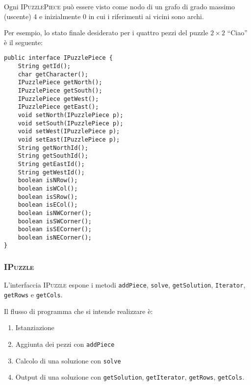 \documentclass[a4paper]{article}
\newcommand{\Classname}[1]{\textsc{#1}}
\newcommand{\Ifacename}[1]{\textsc{#1}}
\newcommand{\Methodname}[1]{\texttt{#1}}
\begin{document}
Ogni \Ifacename{IPuzzlePiece} pu\`o essere visto come nodo di un grafo di grado massimo (uscente) 4 e inizialmente 0 in cui i riferimenti ai vicini sono archi.

Per esempio, lo stato finale desiderato per i quattro pezzi del puzzle $2\times2$ ``Ciao'' \`e il seguente:


\begin{lstlisting}[frame=single]
public interface IPuzzlePiece {
	String getId();
	char getCharacter();
	IPuzzlePiece getNorth();
	IPuzzlePiece getSouth();
	IPuzzlePiece getWest();
	IPuzzlePiece getEast();
	void setNorth(IPuzzlePiece p);
	void setSouth(IPuzzlePiece p);
	void setWest(IPuzzlePiece p);
	void setEast(IPuzzlePiece p);
	String getNorthId();
	String getSouthId();
	String getEastId();
	String getWestId();
	boolean isNRow();
	boolean isWCol();
	boolean isSRow();
	boolean isECol();
	boolean isNWCorner();
	boolean isSWCorner();
	boolean isSECorner();
	boolean isNECorner();
}
\end{lstlisting}

\subsubsection{\Classname{IPuzzle}}
L'interfaccia \Ifacename{IPuzzle} espone i metodi \Methodname{addPiece}, \Methodname{solve}, \Methodname{getSolution}, \Methodname{Iterator}, \Methodname{getRows} e \Methodname{getCols}.

Il flusso di programma che si intende realizzare \`e:

\begin{enumerate}
\item Istanziazione
\item Aggiunta dei pezzi con \Methodname{addPiece}
\item Calcolo di una soluzione con \Methodname{solve}
\item Output di una soluzione con \Methodname{getSolution}, \Methodname{getIterator}, \Methodname{getRows}, \Methodname{getCols}.
\end{enumerate}
\end{document}
